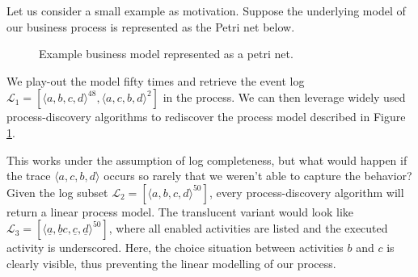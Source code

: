 Let us consider a small example as motivation. Suppose the underlying model of our business process is represented as the Petri net below.

\begin{figure}[h]
    \centering
\caption{Example business model represented as a petri net.}
\label{petrinet}

\end{figure}

We play-out the model fifty times and retrieve the event log $\mathcal{L}_1 = [ \langle a, b, c, d \rangle ^{48}, \langle a, c, b, d \rangle^2 ]$ in the process. We can then leverage widely used process-discovery algorithms to rediscover the process model described in Figure \ref{petrinet}. 

This works under the assumption of log completeness, but what would happen if the trace $\langle a, c, b, d \rangle$ occurs so rarely that we weren't able to capture the behavior? Given the log subset $\mathcal{L}_2 = [ \langle a, b, c, d \rangle ^{50}]$, every process-discovery algorithm will return a linear process model. The translucent variant would look like $\mathcal{L}_3 = [ \langle \underline{a}, \underline{b}c,  \underline{c},  \underline{d} \rangle ^{50}]$, where all enabled activities are listed and the executed activity is underscored. Here, the choice situation between activities $b$ and $c$ is clearly visible, thus preventing the linear modelling of our process.

